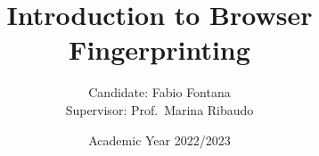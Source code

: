 \documentclass{beamer}
\title{Introduction to Browser Fingerprinting}
\author[Fabio Fontana]{Candidate: Fabio Fontana \\ {\small Supervisor: Prof.~Marina Ribaudo}}
\institute{University of Genoa}
\date{Academic Year 2022/2023}
\begin{document}
\frame{\titlepage}
\end{document}
